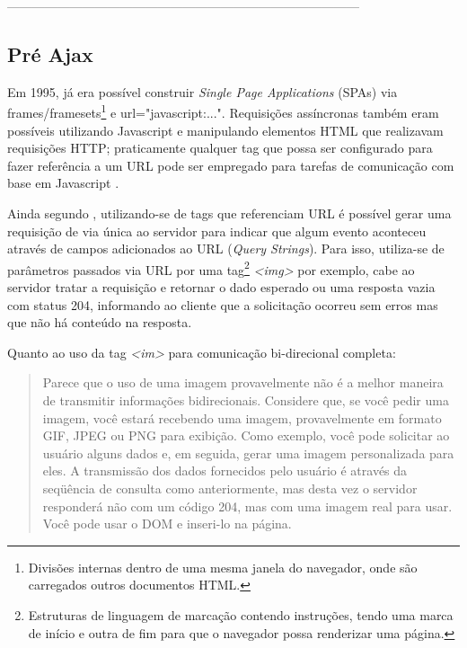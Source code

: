 ------------------------------------------------------------------------------------
\subsection{Pré Ajax}

Em 1995, já era possível construir \textit{Single Page Applications} (SPAs) via frames/framesets\footnote{Divisões internas dentro de uma mesma janela do navegador, onde são carregados outros documentos HTML.} e url="javascript:...". Requisições assíncronas também eram possíveis utilizando Javascript e manipulando elementos HTML que realizavam requisições HTTP; praticamente qualquer tag que possa ser configurado para fazer referência a um URL pode ser empregado para tarefas de comunicação com base em Javascript \cite{powell2008ajax}.

Ainda segundo , utilizando-se de tags que referenciam URL é possível gerar uma requisição de via única ao servidor para indicar que algum evento aconteceu através de campos adicionados ao URL (\textit{Query Strings}). Para isso, utiliza-se de parâmetros passados via URL por uma tag\footnote{Estruturas de linguagem de marcação contendo instruções, tendo uma marca de início e outra de fim para que o navegador possa renderizar uma página.} \textit{<img>} por exemplo, cabe ao servidor tratar a requisição e retornar o dado esperado ou uma resposta vazia com status 204, informando ao cliente que a solicitação ocorreu sem erros mas que não há conteúdo na resposta.

Quanto ao uso da tag \textit{<im>} para comunicação bi-direcional  completa:


\begin{quote}
	Parece que o uso de uma imagem provavelmente não é a melhor maneira de transmitir informações bidirecionais. Considere que, se você pedir uma imagem, você estará recebendo uma imagem, provavelmente em formato GIF, JPEG ou PNG para exibição. Como exemplo, você pode solicitar ao usuário alguns dados e, em seguida, gerar uma imagem personalizada para eles. A transmissão dos dados fornecidos pelo usuário é através da seqüência de consulta como anteriormente, mas desta vez o servidor responderá não com um código 204, mas com uma imagem real para usar. Você pode usar o DOM e inseri-lo na página.
\end{quote}

